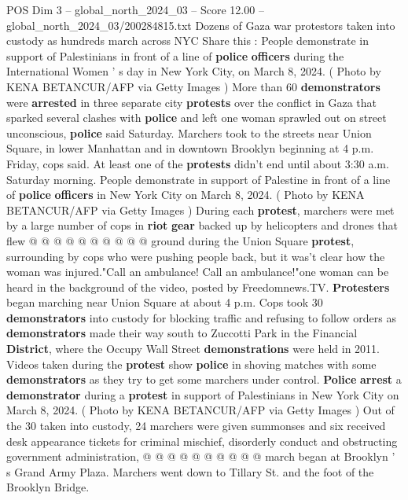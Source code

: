 \begin{textsample}{POS Dim 3 – global\_north\_2024\_03 – Score 12.00 – global\_north\_2024\_03/200284815.txt}  \label{ex:f3_pos_271}
Dozens of Gaza war protestors taken into custody as hundreds march across NYC Share this : People demonstrate in support of Palestinians in front of a line of \textbf{police} \textbf{officers} during the International Women ' s day in New York City, on March 8, 2024. ( Photo by KENA BETANCUR/AFP via Getty Images ) More than 60 \textbf{demonstrators} were \textbf{arrested} in three separate city \textbf{protests} over the conflict in Gaza that sparked several clashes with \textbf{police} and left one woman sprawled out on street unconscious, \textbf{police} said Saturday.
Marchers took to the streets near Union Square, in lower Manhattan and in downtown Brooklyn beginning at 4 p.m.
Friday, cops said.
At least one of the \textbf{protests} didn't end until about 3:30 a.m.
Saturday morning.
People demonstrate in support of Palestine in front of a line of \textbf{police} \textbf{officers} in New York City on March 8, 2024. ( Photo by KENA BETANCUR/AFP via Getty Images ) During each \textbf{protest}, marchers were met by a large number of cops in \textbf{riot} \textbf{gear} backed up by helicopters and drones that flew @ @ @ @ @ @ @ @ @ @ ground during the Union Square \textbf{protest}, surrounding by cops who were pushing people back, but it was't clear how the woman was injured."Call an ambulance!
Call an ambulance!"one woman can be heard in the background of the video, posted by Freedomnews.TV. \textbf{Protesters} began marching near Union Square at about 4 p.m.
Cops took 30 \textbf{demonstrators} into custody for blocking traffic and refusing to follow orders as \textbf{demonstrators} made their way south to Zuccotti Park in the Financial \textbf{District}, where the Occupy Wall Street \textbf{demonstrations} were held in 2011.
Videos taken during the \textbf{protest} show \textbf{police} in shoving matches with some \textbf{demonstrators} as they try to get some marchers under control. \textbf{Police} \textbf{arrest} a \textbf{demonstrator} during a \textbf{protest} in support of Palestinians in New York City on March 8, 2024. ( Photo by KENA BETANCUR/AFP via Getty Images ) Out of the 30 taken into custody, 24 marchers were given summonses and six received desk appearance tickets for criminal mischief, disorderly conduct and obstructing government administration, @ @ @ @ @ @ @ @ @ @ march began at Brooklyn ' s Grand Army Plaza.
Marchers went down to Tillary St. and the foot of the Brooklyn Bridge.

\end{textsample}
